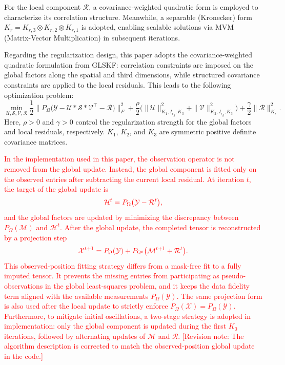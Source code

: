 \documentclass[a4paper,12pt]{article}
\numberwithin{equation}{section}
\numberwithin{algorithm}{section}
\newcommand{\rev}[1]{\textcolor{red}{#1}}
\newcommand{\revnote}[1]{\textcolor{red}{[Revision note: #1]}}
\theoremstyle{remark}
\theoremstyle{definition}
\begin{document}
For the local component $\mathcal{R}$, a covariance-weighted quadratic form is employed to characterize its correlation structure. Meanwhile, a separable (Kronecker) form
$K_r = K_{r,3}\otimes K_{r,2}\otimes K_{r,1}$ is adopted,
enabling scalable solutions via MVM (Matrix-Vector Multiplication) in subsequent iterations\cite{lei2024glskf,allen2014glsmd}.

Regarding the regularization design, this paper adopts the covariance-weighted quadratic formulation from GLSKF: correlation constraints are imposed on the global factors along the spatial and third dimensions, while structured covariance constraints are applied to the local residuals. This leads to the following optimization problem:
\begin{equation}
	\min_{\mathcal{U},\mathcal{S},\mathcal{V},\mathcal{R}}
	\frac{1}{2}\Big\|P_{\Omega}\big(\mathcal{Y}-\mathcal{U}*\mathcal{S}*\mathcal{V}^{\top}-\mathcal{R}\big)\Big\|_{F}^{2}
	+\frac{\rho}{2}\Big(\|\mathcal{U}\|^{2}_{K_1,I_{r_g},K_3}+\|\mathcal{V}\|^{2}_{K_2,I_{r_g},K_3}\Big)
	+\frac{\gamma}{2}\|\mathcal{R}\|^{2}_{K_r}.
	\label{eq:overall_obj}
\end{equation}
Here, $\rho>0$ and $\gamma>0$ control the regularization strength for the global factors and local residuals, respectively. $K_1$, $K_2$, and $K_3$ are symmetric positive definite covariance matrices.

\rev{In the implementation used in this paper, the observation operator is not removed from the global update. Instead, the global component is fitted only on the observed entries after subtracting the current local residual. At iteration $t$, the target of the global update is}
\begin{equation}
	\rev{\mathcal{H}^{t}=P_{\Omega}\big(\mathcal{Y}-\mathcal{R}^{t}\big),}
	\label{eq:observed_global_target}
\end{equation}
\rev{and the global factors are updated by minimizing the discrepancy between $P_{\Omega}(\mathcal{M})$ and $\mathcal{H}^{t}$. After the global update, the completed tensor is reconstructed by a projection step}
\begin{equation}
	\rev{\mathcal{X}^{t+1}=P_{\Omega}(\mathcal{Y})+P_{\Omega^{c}}\big(\mathcal{M}^{t+1}+\mathcal{R}^{t}\big).}
	\label{eq:proj}
\end{equation}
\rev{This observed-position fitting strategy differs from a mask-free fit to a fully imputed tensor. It prevents the missing entries from participating as pseudo-observations in the global least-squares problem, and it keeps the data fidelity term aligned with the available measurements $P_{\Omega}(\mathcal{Y})$. The same projection form is also used after the local update to strictly enforce $P_{\Omega}(\mathcal{X})=P_{\Omega}(\mathcal{Y})$. Furthermore, to mitigate initial oscillations, a two-stage strategy is adopted in implementation: only the global component is updated during the first $K_0$ iterations, followed by alternating updates of $\mathcal{M}$ and $\mathcal{R}$.} \revnote{The algorithm description is corrected to match the observed-position global update in the code.}
\end{document}
